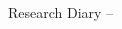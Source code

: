 \documentclass[11pt,a4paper]{article}
\newcommand{\Title}{Research Diary}
\begin{document}
  \thispagestyle{plain}

  \begin{center}
    {\LARGE\Title{} -- \Name{}}
  \end{center}

  \vspace{0.5cm}

  \begin{multicols*}{2}
    
  \end{multicols*}
\end{document}
